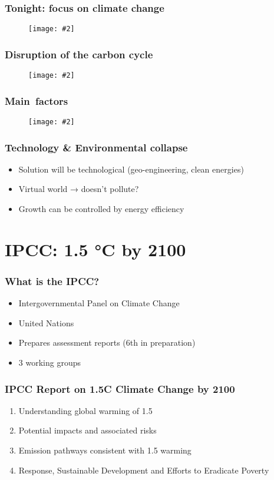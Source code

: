 \documentclass[10pt]{beamer}
\newcommand{\imgtw}[2][1]{%
  \begin{figure}%
    \centering%
    \texttt{[image: \#2]}%
  \end{figure}%
}
\newcommand{\imgth}[2][1]{%
  \begin{figure}%
    \centering%
    \texttt{[image: \#2]}%
  \end{figure}%
}
\begin{document}
\begin{frame}
  \frametitle{Tonight: focus on climate change}

  \imgtw{carbon-dioxide-400kyr}
\end{frame}

\begin{frame}
  \frametitle{Disruption of the carbon cycle}

  \imgth[.9]{carbon-cycle}
\end{frame}

\begin{frame}[standout]
  \frametitle{Main factors}

  \imgth[.9]{radiative-forcings}
\end{frame}

\begin{frame}
  \frametitle{Technology \& Environmental collapse}


  \begin{itemize}[<+->]
  \item Solution will be technological (geo-engineering, clean
    energies)
  \item Virtual world → doesn't pollute?
  \item Growth can be controlled by energy efficiency
  \end{itemize}

\end{frame}

\section{IPCC: 1.5 °C by 2100}
\label{sec:1.5C-by-2100}

\begin{frame}
  \frametitle{What is the IPCC?}
  \begin{itemize}[<+->]
  \item Intergovernmental Panel on Climate Change
  \item United Nations
  \item Prepares assessment reports (6th in preparation)
  \item 3 working groups
  \end{itemize}
\end{frame}

\begin{frame}
  \frametitle{IPCC Report on 1.5\textdegree C Climate Change by 2100}


  \begin{enumerate}[<+->]
  \item Understanding global warming of 1.5\celsius
  \item Potential impacts and associated risks
  \item Emission pathways consistent with 1.5\celsius{} warming
  \item Response, Sustainable Development and Efforts to Eradicate
    Poverty
  \end{enumerate}

\end{frame}
\end{document}
